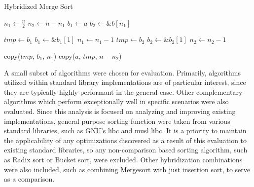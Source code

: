 \documentclass[12pt, conference]{ieeeconf}
\begin{document}
\begin{algorithm}[ht]
	\caption{Hybridized Merge Sort}
	\label{alg:merge_sort}
	\begin{algorithmic}
		\State \Return
		\EndIf

		\State {}
		\State \Return
		\State {}
		\State \Return
		\State {}
		\State \Return
		\EndIf

		\State {}
		\State \Return
		\EndIf

		\State $n_{1} \gets \frac{n}{2}$
		\State $n_{2} \gets n - n_{1}$
		\State $b_{1} \gets a$
		\State $b_{2} \gets \&b[n_{1}]$

		\State {}
		\State {}

		\State $tmp \gets b_{1}$
		\State $b_{1} \gets \&b_{1}[1]$
		\State $n_{1} \gets n_{1} - 1$
		\Else
		\State $tmp \gets b_{2}$
		\State $b_{2} \gets \&b_{2}[1]$
		\State $n_{2} \gets n_{2} - 1$
		\EndIf
		\EndWhile

		\State copy($tmp$, $b_{1}$, $n_{1}$)
		\EndIf
		\EndProcedure
		\State copy($a$, $tmp$, $n - n_{2}$)
	\end{algorithmic}
\end{algorithm}


A small subset of algorithms were chosen for evaluation. Primarily, algorithms
utilized within standard library implementations are of particular interest,
since they are typically highly performant in the general case. Other
complementary algorithms which perform exceptionally well in specific scenarios
were also evaluated. Since this analysis is focused on analyzing and improving
existing implementations, general purpose sorting function were taken from
various standard libraries, such as GNU's libc\parencite{glibc} and musl
libc\parencite{musl_libc}. It is a priority to maintain the applicability of any
optimizations discovered as a result of this evaluation to existing standard
libraries, so any non-comparison based sorting algorithm, such as Radix sort or
Bucket sort, were excluded. Other hybridization combinations were also included,
such as combining Mergesort with just insertion sort, to serve as a comparison.
\end{document}
